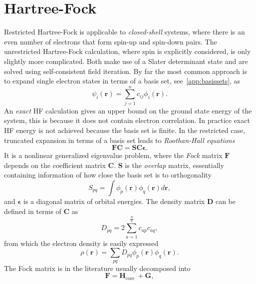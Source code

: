 \documentclass[final,3p,times,twocolumn]{elsarticle}
\begin{document}
	\section{Hartree-Fock}
	\label{app:HF}
	Restricted Hartree-Fock is applicable to \emph{closed-shell} systems, where there is an even number of electrons that form spin-up and spin-down pairs. The unrestricted Hartree-Fock calculation, where spin is explicitly considered, is only slightly more complicated. Both make use of a Slater determinant state and are solved using self-consistent field iteration. By far the most common approach is to expand single electron states in terms of a basis set, see~\ref{app:basissets}, as
	\begin{equation}
		\psi_{i}(\mathbf{r})=\sum_{j=1}^{n} c_{i j} \phi_{i}(\mathbf{r}).
	\end{equation}
	An \emph{exact} HF calculation gives an upper bound on the ground state energy of the system, this is because it does not contain electron correlation. In practice exact HF energy is not achieved because the basis set is finite. In the restricted case, truncated expansion in terms of a basis set leads to \emph{Roothan-Hall equations}
	\begin{equation}
		\mathbf{F}\mathbf{C} = \mathbf{S}\mathbf{C}\mathbf{\epsilon}.
	\end{equation}
	It is a nonlinear generalized eigenvalue problem, where the \emph{Fock} matrix $\mathbf{F}$ depends on the coefficient matrix $\mathbf{C}$. $\mathbf{S}$ is the \emph{overlap} matrix, essentially containing information of how close the basis set is to orthogonality
	\begin{equation}
		S_{p q}=\int \phi_{p}(\mathbf{r}) \phi_{q}(\mathbf{r}) d \mathbf{r},
	\end{equation}
	and $\mathbf{\epsilon}$ is a diagonal matrix of orbital energies. The density matrix $\mathbf{D}$ can be defined in terms of $\mathbf{C}$ as
	\begin{equation}
		D_{p q}=2 \sum_{a=1}^{\frac{N}{2}} c_{a p} c_{a q},
	\end{equation}
	from which the electron density is easily expressed
	\begin{equation}
		\rho(\mathbf{r})=\sum_{p q} D_{p q} \phi_{p}(\mathbf{r}) \phi_{q}(\mathbf{r}).
	\end{equation}
	The Fock matrix is in the literature usually decomposed into
	\begin{equation}
		\mathbf{F}=\mathbf{H}_{\text {core }}+\mathbf{G},
	\end{equation}
\end{document}
